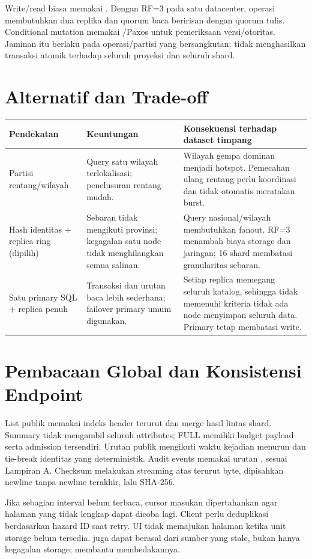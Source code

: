 Write/read biasa memakai . Dengan RF=3 pada satu datacenter, operasi membutuhkan dua replika dan quorum baca beririsan dengan quorum tulis. Conditional mutation memakai /Paxos untuk pemeriksaan versi/otoritas. Jaminan itu berlaku pada operasi/partisi yang bersangkutan; tidak menghasilkan transaksi atomik terhadap seluruh proyeksi dan seluruh shard.

\section{Alternatif dan Trade-off}
\begin{longtable}{@{}P{3.2cm}P{5.8cm}P{6.5cm}@{}}
\toprule Pendekatan & Keuntungan & Konsekuensi terhadap dataset timpang\\\midrule\endhead
Partisi rentang/wilayah & Query satu wilayah terlokalisasi; penelusuran rentang mudah. & Wilayah gempa dominan menjadi hotspot. Pemecahan ulang rentang perlu koordinasi dan tidak otomatis meratakan burst.\\
Hash identitas + replica ring (dipilih) & Sebaran tidak mengikuti provinsi; kegagalan satu node tidak menghilangkan semua salinan. & Query nasional/wilayah membutuhkan fanout. RF=3 menambah biaya storage dan jaringan; 16 shard membatasi granularitas sebaran.\\
Satu primary SQL + replica penuh & Transaksi dan urutan baca lebih sederhana; failover primary umum digunakan. & Setiap replica memegang seluruh katalog, sehingga tidak memenuhi kriteria tidak ada node menyimpan seluruh data. Primary tetap membatasi write.\\\bottomrule
\end{longtable}

\section{Pembacaan Global dan Konsistensi Endpoint}
List publik memakai indeks header terurut dan merge hasil lintas shard. Summary tidak mengambil seluruh attributes; FULL memiliki budget payload serta admission tersendiri. Urutan publik mengikuti waktu kejadian menurun dan tie-break identitas yang deterministik. Audit events memakai urutan , sesuai Lampiran A. Checksum melakukan streaming atas  terurut byte, dipisahkan newline tanpa newline terakhir, lalu SHA-256.

Jika sebagian interval belum terbaca, cursor masukan dipertahankan agar halaman yang tidak lengkap dapat dicoba lagi. Client perlu deduplikasi berdasarkan hazard ID saat retry. UI tidak memajukan halaman ketika unit storage belum tersedia.  juga dapat berasal dari sumber yang stale, bukan hanya kegagalan storage;  membantu membedakannya.

